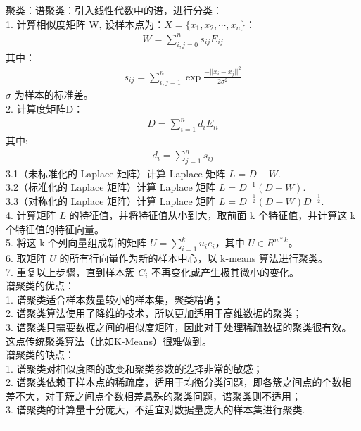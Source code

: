 \documentclass{article}
\begin{document}
\noindent 聚类：谱聚类：引入线性代数中的谱，进行分类：\\
1. 计算相似度矩阵 W, 设样本点为：$X=\{x_{1}, x_{2}, \cdots, x_{n}\}$：
\begin{eqnarray*}
W = \sum_{i,j=0}^{n}s_{ij}E_{ij}
\end{eqnarray*}
其中：
\begin{eqnarray*}
s_{ij} = \sum_{i,j=1}^{n}\exp{\frac{-||x_{i}-x_{j}||^{2}}{2\sigma^{2}}}
\end{eqnarray*}
$\sigma$ 为样本的标准差。\\
2. 计算度矩阵D：
\begin{eqnarray*}
D = \sum_{i=1}^{n}d_{i}E_{ii}
\end{eqnarray*}
其中:
\begin{eqnarray*}
d_{i} = \sum_{j=1}^{n}s_{ij}
\end{eqnarray*}
3.1（未标准化的 Laplace 矩阵）计算 Laplace 矩阵 $L=D-W$.\\
3.2（标准化的 Laplace 矩阵）计算 Laplace 矩阵 $L=D^{-1}(D-W)$.\\
3.3（对称化的 Laplace 矩阵）计算 Laplace 矩阵 $L=D^{-\frac{1}{2}}(D-W)D^{-\frac{1}{2}}$.\\
4. 计算矩阵 $L$ 的特征值，并将特征值从小到大，取前面 k 个特征值，并计算这 k 个特征值的特征向量。\\
5. 将这 k 个列向量组成新的矩阵 $U=\sum_{i=1}^{k}u_{i}e_{i}$，其中 $U\in R^{n*k}$。\\
6. 取矩阵 $U$ 的所有行向量作为新的样本中心，以 k-means 算法进行聚类。\\
7. 重复以上步骤，直到样本簇 $C_{i}$ 不再变化或产生极其微小的变化。\\
谱聚类的优点：\\
1. 谱聚类适合样本数量较小的样本集，聚类精确；\\
2. 谱聚类算法使用了降维的技术，所以更加适用于高维数据的聚类；\\
3. 谱聚类只需要数据之间的相似度矩阵，因此对于处理稀疏数据的聚类很有效。这点传统聚类算法（比如K-Means）很难做到。\\
谱聚类的缺点：\\
1. 谱聚类对相似度图的改变和聚类参数的选择非常的敏感；\\
2. 谱聚类依赖于样本点的稀疏度，适用于均衡分类问题，即各簇之间点的个数相差不大，对于簇之间点个数相差悬殊的聚类问题，谱聚类则不适用；\\
3. 谱聚类的计算量十分庞大，不适宜对数据量庞大的样本集进行聚类.\\
--------------------------------------------------------------------------------------------------\\
\end{document}
